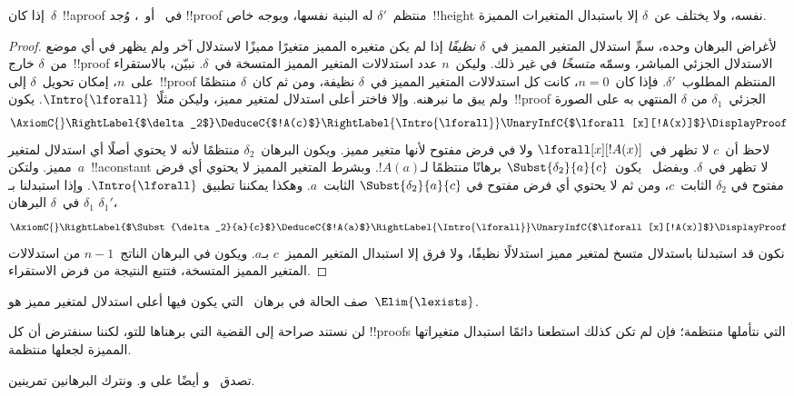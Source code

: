 \documentclass[../../../include/open-logic-section]{subfiles}
\begin{document}
\begin{prop}
إذا كان~$\delta$~!!a{proof} في~ أو~، وُجد
!!{proof} منتظم~$\delta'$ له البنية نفسها، وبوجه خاص~!!{height} نفسه،
ولا يختلف عن~$\delta$ إلا باستبدال المتغيرات المميزة.
\end{prop}

\begin{proof}
لأغراض البرهان وحده، سمِّ استدلال المتغير المميز في~$\delta$
\emph{نظيفًا} إذا لم يكن متغيره المميز متغيرًا مميزًا لاستدلال آخر ولم
يظهر في أي موضع من~$\delta$ خارج~!!{proof} الاستدلال الجزئي المباشر،
وسمّه \emph{متسخًا} في غير ذلك. وليكن~$n$ عدد استدلالات المتغير المميز
المتسخة في~$\delta$. نبيّن، بالاستقراء على~$n$، إمكان تحويل~$\delta$
إلى~!!{proof} المنتظم المطلوب~$\delta'$. فإذا كان~$n=0$، كانت كل
استدلالات المتغير المميز في~$\delta$ نظيفة، ومن ثم كان~$\delta$
منتظمًا ولم يبق ما نبرهنه. وإلا فاختر أعلى استدلال لمتغير مميز، وليكن
مثلًا~$\Intro{\lforall}$. يكون~!!{proof} الجزئي~$\delta_1$ من
$\delta$ المنتهي به على الصورة
    \[
    \AxiomC{}
    \RightLabel{$\delta_2$}
    \DeduceC{$!A(c)$}
    \RightLabel{\Intro{\lforall}}
    \UnaryInfC{$\lforall[x][!A(x)]$}
    \DisplayProof
    \]
لاحظ أن~$c$ لا تظهر في~$\lforall[x][!A(x)]$ ولا في فرض مفتوح لأنها
متغير مميز. ويكون البرهان~$\delta_2$ منتظمًا لأنه لا يحتوي أصلًا أي
استدلال لمتغير مميز. ولتكن~$a$~!!a{constant} لا تظهر في~$\delta$.
وبفضل~ يكون~$\Subst{\delta_2}{a}{c}$ برهانًا
منتظمًا لـ$!A(a)$. وبشرط المتغير المميز لا يحتوي أي فرض مفتوح في
$\delta_2$ الثابت~$c$، ومن ثم لا يحتوي أي فرض مفتوح في
$\Subst{\delta_2}{a}{c}$ الثابت~$a$. وهكذا يمكننا تطبيق
$\Intro{\lforall}$. وإذا استبدلنا بـ$\delta_1$ في~$\delta$ البرهان
$\delta_1'$،
    \[
    \AxiomC{}
    \RightLabel{$\Subst{\delta_2}{a}{c}$}
    \DeduceC{$!A(a)$}
    \RightLabel{\Intro{\lforall}}
    \UnaryInfC{$\lforall[x][!A(x)]$}
    \DisplayProof
    \]
نكون قد استبدلنا باستدلال متسخ لمتغير مميز استدلالًا نظيفًا، ولا فرق
إلا استبدال المتغير المميز~$c$ بـ$a$. ويكون في البرهان الناتج~$n-1$
من استدلالات المتغير المميز المتسخة، فتتبع النتيجة من فرض الاستقراء.
\end{proof}

\begin{prob}
صف الحالة في برهان~ التي يكون فيها أعلى استدلال
لمتغير مميز هو~$\Elim{\lexists}$.
\end{prob}

لن نستند صراحة إلى القضية التي برهناها للتو، لكننا سنفترض أن كل
!!{proof}s التي نتأملها منتظمة؛ فإن لم تكن كذلك استطعنا دائمًا استبدال
متغيراتها المميزة لجعلها منتظمة.

تصدق~ و أيضًا على
 و. ونترك البرهانين تمرينين.
\end{document}
